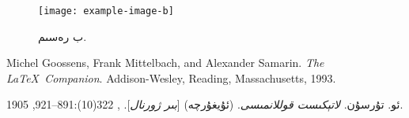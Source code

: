 \documentclass[a4paper]{book}
\begin{document}
\begin{figure}
	\begin{center}
	\texttt{[image: example-image-b]}
	\caption{ب رەسىم.}
	\end{center}
\end{figure}

\begin{thebibliography}{9}
	Michel Goossens, Frank Mittelbach, and Alexander Samarin. 
	\textit{The \LaTeX\ Companion}. 
	Addison-Wesley, Reading, Massachusetts, 1993.
	
	ئو. تۇرسۇن. 
	\textit{لاتېكىست قوللانمىسى}. (ئۇيغۇرچە) 
	[\textit{بىر ژورنال}]. , 322(10):891–921, 1905.
\end{thebibliography}
\end{document}
